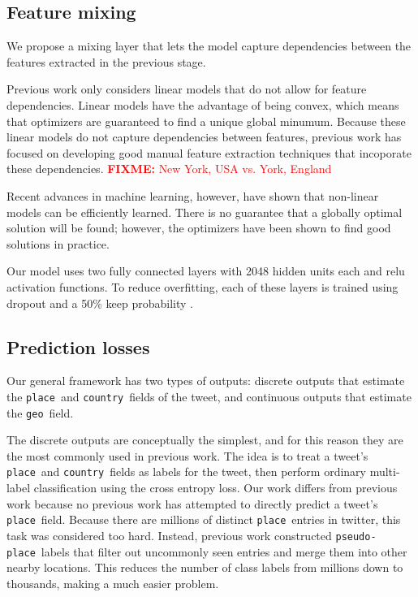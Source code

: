\documentclass[sigconf,10pt]{acmart}
\newcommand{\fixme}[1]{\textcolor{red}{\textbf{FIXME:} {#1}}}
\newcommand{\tweetdata}[1]{{\texttt{#1}~}}
\newcommand{\place        }{\tweetdata{place}}
\newcommand{\pseudoplace  }{\tweetdata{pseudo-place}}
\renewcommand{\country      }{\tweetdata{country}}
\newcommand{\geo          }{\tweetdata{geo}}
\begin{document}
\subsection{Feature mixing}

We propose a mixing layer that lets the model capture dependencies between the features extracted in the previous stage.

Previous work only considers linear models that do not allow for feature dependencies.
Linear models have the advantage of being convex,
which means that optimizers are guaranteed to find a unique global minumum.
Because these linear models do not capture dependencies between features,
previous work has focused on developing good manual feature extraction techniques that incoporate these dependencies.
\fixme{New York, USA vs. York, England}

Recent advances in machine learning, however, have shown that non-linear models can be efficiently learned.
There is no guarantee that a globally optimal solution will be found;
however, the optimizers have been shown to find good solutions in practice.

Our model uses two fully connected layers with 2048 hidden units each and relu activation functions.
To reduce overfitting, each of these layers is trained using dropout and a 50\% keep probability \citep{}.

\subsection{Prediction losses}

Our general framework has two types of outputs:
discrete outputs that estimate the \place and \country fields of the tweet,
and continuous outputs that estimate the \geo field.

The discrete outputs are conceptually the simplest,
and for this reason they are the most commonly used in previous work.
The idea is to treat a tweet's \place and \country fields as labels for the tweet,
then perform ordinary multi-label classification using the cross entropy loss.
Our work differs from previous work because no previous work has attempted to directly predict a tweet's \place field.
Because there are millions of distinct \place entries in twitter,
this task was considered too hard.
Instead, previous work constructed \pseudoplace labels that filter out uncommonly seen entries and merge them into other nearby locations.
This reduces the number of class labels from millions down to thousands,
making a much easier problem.
\end{document}
